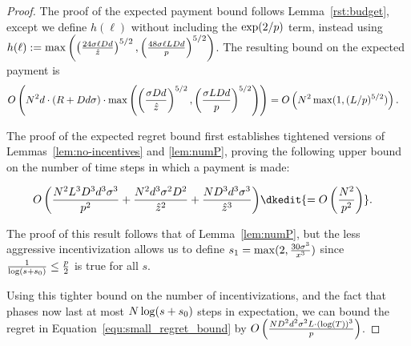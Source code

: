 \begin{proof}
The proof of the expected payment bound follows Lemma~\ref{rst:budget},
except we define $h(\ell)$ without including the $\exp(2/p)$ term,
instead using
$h(\ell) := \max \left(
  \left(\frac{24\sigma \ell D d}{\hat{z}} \right)^{5/2},
  \left( \frac{48\sigma \ell L D d}{p} \right)^{5/2}
\right)$.
The resulting bound on the expected payment is
\begin{align*}
O\left( N^2 d \cdot (R+D d\sigma) \cdot
  \max \left(
    \left(\frac{\sigma D d}{\hat{z}} \right)^{5/2},
    \left( \frac{\sigma L D d}{p} \right)^{5/2}
    \right) \right)
& = O\left(N^2 \max (1, (L/p)^{5/2}) \right).
\end{align*}

The proof of the expected regret bound first establishes tightened versions of Lemmas~\ref{lem:no-incentives} and \ref{lem:numP},
proving the following upper bound on the number of time steps in which a payment is made:
    
\begin{align*}
O\left(\frac{\ARMNUM^2 \TieDensity^3 \Diam^3 d^3 \sigma^3}{\MinProb^2}
    + \frac{\ARMNUM^2 d^3 \sigma^2 \Diam^2}{\TieCutoff^2} + \frac{\ARMNUM \Diam^3 d^3 \sigma^3}{\TieCutoff^3}
  \right)
& \dkedit{= O \left( \frac{\ARMNUM^2}{\MinProb^2} \right)}.
\end{align*}

The proof of this result follows that of Lemma~\ref{lem:numP},
but the less aggressive incentivization allows us to define
$s_1 = \max(2, \frac{30 \sigma^3}{x^3})$
since $\frac{1}{\log(s+s_0)} \leq \frac{p}{2}$ is true for all $s$.

Using this tighter bound on the number of incentivizations,
and the fact that phases now last at most $N \log(s+s_0)$ steps in expectation,
we can bound the regret in Equation~\eqref{equ:small_regret_bound} by
$O\left(\frac{ND^2 d^2\sigma^2 L \cdot (\log(T))^3}{p}\right)$.
\end{proof}
